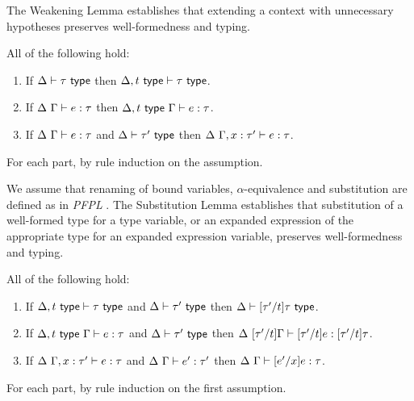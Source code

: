 The Weakening Lemma establishes that extending a context with unnecessary hypotheses preserves well-formedness and typing.
\begin{lemma}[Weakening]\label{lemma:weakening-U} All of the following hold: 
\begin{enumerate} 
\item If $\Delta \vdash \tau~\mathsf{type}$ then $\Delta, t~\mathsf{type} \vdash \tau~\mathsf{type}$.
\item If $\Delta~\Gamma \vdash e : \tau$ then $\Delta, t~\mathsf{type}~\Gamma \vdash e : \tau$.
\item If $\Delta~\Gamma \vdash e : \tau$ and $\Delta \vdash \tau'~\mathsf{type}$ then $\Delta~\Gamma, x : \tau' \vdash e : \tau$.
\end{enumerate}
\end{lemma}
\begin{proof-sketch} For each part, by rule induction on the assumption. 
\end{proof-sketch}

We assume that renaming of bound variables, $\alpha$-equivalence and substitution are defined as in \emph{PFPL} \cite{pfpl}. The Substitution Lemma establishes that substitution of a well-formed type for a type variable, or an expanded expression of the appropriate type for an expanded expression variable, preserves well-formedness and typing. 
\begin{lemma}[Substitution]\label{lemma:substitution-U} All of the following hold:
\begin{enumerate}
\item If $\Delta, t~\mathsf{type} \vdash \tau~\mathsf{type}$ and $\Delta \vdash \tau'~\mathsf{type}$ then $\Delta \vdash [\tau'/t]\tau~\mathsf{type}$.
\item If $\Delta, t~\mathsf{type}~\Gamma \vdash e : \tau$ and $\Delta \vdash \tau'~\mathsf{type}$ then $\Delta~[\tau'/t]\Gamma \vdash [\tau'/t]e : [\tau'/t]\tau$.
\item If $\Delta~\Gamma, x : \tau' \vdash e : \tau$ and $\Delta~\Gamma \vdash e' : \tau'$ then $\Delta~\Gamma \vdash [e'/x]e : \tau$.
\end{enumerate}\end{lemma}
\begin{proof-sketch}
For each part, by rule induction on the first assumption.
\end{proof-sketch}

